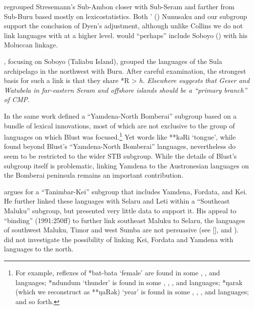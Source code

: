 \citet{Dyen1978b} regrouped Stresemann’s Sub-Ambon closer with
Sub-Seram and farther from Sub-Buru based mostly on lexicostatistics.
Both \citeauthor{Collins1983}’ (\citeyear{Collins1983}) Nunusaku
and our  subgroup support the conclusion of
Dyen’s adjustment, although unlike Collins we do not link  languages
with  at a higher level.
\citet[45]{Dyen1965} would “perhaps” include Soboyo ()
with his Moluccan linkage.

\citet{Blust1981}, focusing on Soboyo (Taliabu Island),
grouped the languages of the Sula archipelago in the northwest with Buru.
After careful examination, the strongest basis for such a link
is that they share *R > \it{h}.
Elsewhere \citet[279]{Blust1993} suggests that Geser
and Watubela in far-eastern Seram
and offshore islands should be a “primary branch” of CMP.

In the same work \citet[276ff]{Blust1993} defined a “Yamdena-North
Bomberai” subgroup based on a bundle of lexical innovations,
most of which are not exclusive to the group of languages on
which Blust was focused.\footnote{
For example,
reflexes of *bat-bata ‘female’ are found in some ,
, and  languages; *ndundum ‘thunder’
is found in some ,
, , and  languages;
*ŋarak (which we reconstruct as **ŋaRək) ‘year’ is found in some
, , , and 
languages; and so forth.}
Yet words like **kəRi ‘tongue’,
while found beyond Blust’s “Yamdena-North Bomberai” languages,
nevertheless do seem to be restricted to the wider STB  subgroup.
While the details of Blust’s subgroup itself is problematic,
linking Yamdena to the Austronesian languages on the Bomberai
peninsula remains an important contribution.

\citet{Mills1991} argues for a “Tanimbar-Kei” subgroup that includes
Yamdena, Fordata, and Kei.
He further linked these languages with Selaru
and Leti within a “Southeast Maluku” subgroup,
but presented very little data to support it.
His appeal to “binding” (1991:250ff) to further link southeast
Maluku to Selaru, the languages of southwest Maluku,
Timor and west Sumba are not persuasive
(see \citeauthor{Blust1993} [\citeyear[276]{Blust1993}], and ).
\citet{Mills1991} did not investigate the possibility of linking
Kei, Fordata and Yamdena with languages to the north.

